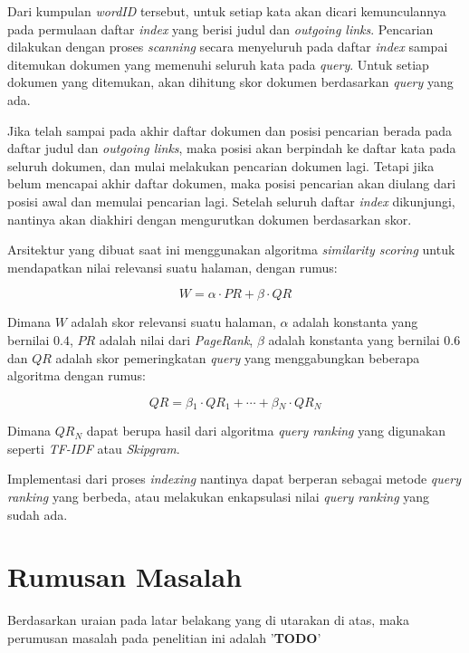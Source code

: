 Dari kumpulan \emph{wordID} tersebut, untuk setiap kata akan dicari
kemunculannya pada permulaan daftar \emph{index} yang berisi judul dan
\emph{outgoing links}.  Pencarian dilakukan dengan proses \emph{scanning} secara
menyeluruh pada daftar \emph{index} sampai ditemukan dokumen yang memenuhi
seluruh kata pada \emph{query}. Untuk setiap dokumen yang ditemukan, akan
dihitung skor dokumen berdasarkan \emph{query} yang ada.

Jika telah sampai pada akhir daftar dokumen dan posisi pencarian berada pada
daftar judul dan \emph{outgoing links}, maka posisi akan berpindah ke daftar
kata pada seluruh dokumen, dan mulai melakukan pencarian dokumen lagi. Tetapi
jika belum mencapai akhir daftar dokumen, maka posisi pencarian akan diulang
dari posisi awal dan memulai pencarian lagi. Setelah seluruh daftar
\emph{index} dikunjungi, nantinya akan diakhiri dengan mengurutkan dokumen
berdasarkan skor.

Arsitektur yang dibuat saat ini menggunakan algoritma \emph{similarity scoring}
untuk mendapatkan nilai relevansi suatu halaman, dengan rumus:

\begin{equation}
	W = \alpha{} \cdot{} PR + \beta{} \cdot{} QR
\end{equation}

Dimana $W$ adalah skor relevansi suatu halaman, $\alpha{}$ adalah konstanta yang
bernilai $0.4$, $PR$ adalah nilai dari \emph{PageRank}, $\beta{}$ adalah
konstanta yang bernilai $0.6$ dan $QR$ adalah skor pemeringkatan \emph{query}
yang menggabungkan beberapa algoritma dengan rumus:

\begin{equation}
	QR = \beta{}_1 \cdot{} QR_1 + \cdots{} + \beta{}_N \cdot{} QR_N
\end{equation}

Dimana $QR_N$ dapat berupa hasil dari algoritma \emph{query ranking} yang
digunakan seperti \emph{TF-IDF} atau \emph{Skipgram}.

Implementasi dari proses \emph{indexing} nantinya dapat berperan sebagai
metode \emph{query ranking} yang berbeda, atau melakukan enkapsulasi nilai
\emph{query ranking} yang sudah ada.

\section{Rumusan Masalah}
Berdasarkan uraian pada latar belakang yang di utarakan di atas, maka perumusan
masalah pada penelitian ini adalah '\textbf{TODO}'

